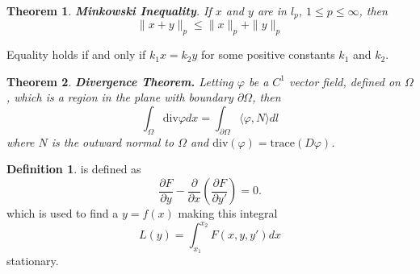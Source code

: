 \documentclass[a4paper]{article}
\theoremstyle{definition}
\newtheorem{definition}{Definition}
\theoremstyle{plain}
\newtheorem{theorem}{Theorem}
\begin{document}
\begin{theorem}
\textbf{Minkowski Inequality}. If $x$ and $y$ are in $l_p$, $1\le p\le\infty$, then
\begin{equation*}
    \|x+y\|_p\le\|x\|_p+\|y\|_p
\end{equation*}
\end{theorem}
Equality holds if and only if $k_1x=k_2y$ for some positive constants $k_1$ and $k_2$.

\begin{theorem}
\textbf{Divergence Theorem.} Letting $\varphi$ be a $C^1$ vector field, defined on $\Omega$, which is a region in the plane with boundary $\partial \Omega$, then
\begin{equation*}
    \int_\Omega\mathrm{div}\varphi dx=\int_{\partial\Omega}\langle\varphi,N\rangle dl
\end{equation*}
where $N$ is the outward normal to $\Omega$ and $\mathrm{div}(\varphi)=\mathrm{trace}(D\varphi)$.
\end{theorem}

\begin{definition}
 is defined as
\begin{equation*}
    \frac{\partial F}{\partial y}-\frac{\partial}{\partial x}\left(\frac{\partial F}{\partial y'}\right)=0.
\end{equation*}
which is used to find a $y=f(x)$ making this integral
\begin{equation*}
    L(y)=\int^{x_2}_{x_1}F(x,y,y')dx
\end{equation*}
stationary.
\end{definition}
\end{document}
